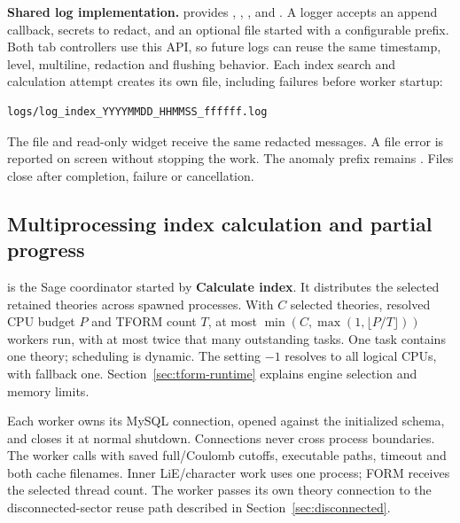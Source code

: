 \textbf{Shared log implementation.}  provides
, , ,
and . A logger accepts an append callback, secrets to redact,
and an optional file started with a configurable prefix. Both tab controllers
use this API, so future logs can reuse the same timestamp, level, multiline,
redaction and flushing behavior. Each index search and calculation attempt
creates its own file, including failures before worker startup:
\begin{lstlisting}
logs/log_index_YYYYMMDD_HHMMSS_ffffff.log
\end{lstlisting}
The file and read-only widget receive the same redacted messages. A file error
is reported on screen without stopping the work. The anomaly prefix remains
. Files close after completion, failure or cancellation.

\clearpage
\subsection{Multiprocessing index calculation and partial progress}
 is the Sage coordinator started by
\textbf{Calculate index}. It distributes the selected retained theories across
spawned processes. With $C$ selected theories, resolved CPU budget $P$
and TFORM count $T$, at most
$\min(C,\max(1,\lfloor P/T\rfloor))$ workers run, with at most twice that many
outstanding tasks. One task contains one theory; scheduling is dynamic.
The setting $-1$ resolves to all logical CPUs, with fallback one.
Section~\ref{sec:tform-runtime} explains engine selection and memory limits.

Each worker owns its MySQL connection, opened against the initialized schema,
and closes it at normal shutdown. Connections never cross process boundaries.
The worker calls  with
saved full/Coulomb cutoffs, executable paths, timeout and both cache filenames.
Inner LiE/character work uses one process; FORM receives the selected thread count.
The worker passes its own theory connection to the disconnected-sector reuse
path described in Section~\ref{sec:disconnected}.

